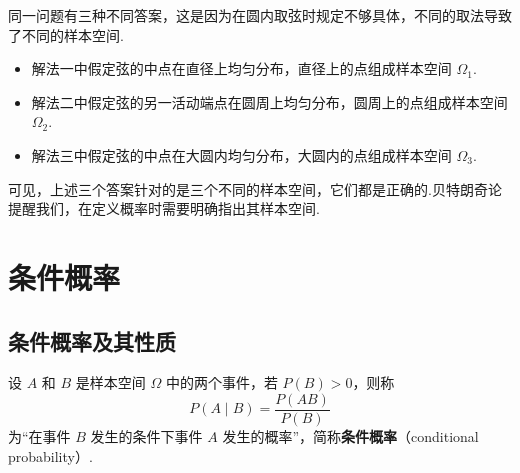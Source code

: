 \begin{note}
    \indent 同一问题有三种不同答案，这是因为在圆内取弦时规定不够具体，不同的取法导致了不同的样本空间.

    \begin{itemize}
        \item 解法一中假定弦的中点在直径上均匀分布，直径上的点组成样本空间 $\varOmega_1$.
        \item 解法二中假定弦的另一活动端点在圆周上均匀分布，圆周上的点组成样本空间 $\varOmega_2$.
        \item 解法三中假定弦的中点在大圆内均匀分布，大圆内的点组成样本空间 $\varOmega_3$.
    \end{itemize}

    可见，上述三个答案针对的是三个不同的样本空间，它们都是正确的.贝特朗奇论提醒我们，在定义概率时需要明确指出其样本空间.
\end{note}




\section{条件概率}

\subsection{条件概率及其性质}

\begin{definition}
    \indent 设 $A$ 和 $B$ 是样本空间 $\varOmega$ 中的两个事件，若 $P(B)>0$，则称
    $$
    P(A \mid B) = \dfrac{P(AB)}{P(B)}
    $$
    为“在事件 $B$ 发生的条件下事件 $A$ 发生的概率”，简称\textbf{条件概率}（conditional probability）.
\end{definition}

